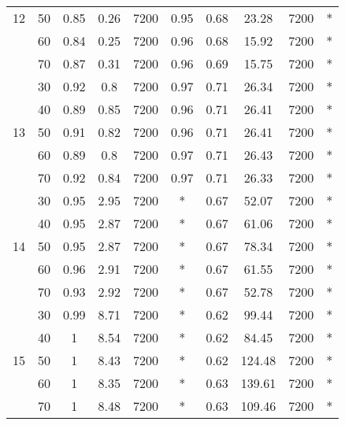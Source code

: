 \documentclass{itor}
\theoremstyle{definition}
\theoremstyle{remark}
\begin{document}
\begin{table}[htbp]
\begin{tabular}{|c|c|cccc|cccc|}
    12    & 50    & 0.85  & 0.26  & 7200  & 0.95  & 0.68  & 23.28 & 7200  & * \\
          & 60    & 0.84  & 0.25  & 7200  & 0.96  & 0.68  & 15.92 & 7200  & * \\
          & 70    & 0.87  & 0.31  & 7200  & 0.96  & 0.69  & 15.75 & 7200  & * \\
    \midrule
          & 30    & 0.92  & 0.8   & 7200  & 0.97  & 0.71  & 26.34 & 7200  & * \\
          & 40    & 0.89  & 0.85  & 7200  & 0.96  & 0.71  & 26.41 & 7200  & * \\
    13    & 50    & 0.91  & 0.82  & 7200  & 0.96  & 0.71  & 26.41 & 7200  & * \\
          & 60    & 0.89  & 0.8   & 7200  & 0.97  & 0.71  & 26.43 & 7200  & * \\
          & 70    & 0.92  & 0.84  & 7200  & 0.97  & 0.71  & 26.33 & 7200  & * \\
    \midrule
          & 30    & 0.95  & 2.95  & 7200  & *     & 0.67  & 52.07 & 7200  & * \\
          & 40    & 0.95  & 2.87  & 7200  & *     & 0.67  & 61.06 & 7200  & * \\
    14    & 50    & 0.95  & 2.87  & 7200  & *     & 0.67  & 78.34 & 7200  & * \\
          & 60    & 0.96  & 2.91  & 7200  & *     & 0.67  & 61.55 & 7200  & * \\
          & 70    & 0.93  & 2.92  & 7200  & *     & 0.67  & 52.78 & 7200  & * \\
    \midrule
          & 30    & 0.99  & 8.71  & 7200  & *     & 0.62  & 99.44 & 7200  & * \\
          & 40    & 1     & 8.54  & 7200  & *     & 0.62  & 84.45 & 7200  & * \\
    15    & 50    & 1     & 8.43  & 7200  & *     & 0.62  & 124.48 & 7200  & * \\
          & 60    & 1     & 8.35  & 7200  & *     & 0.63  & 139.61 & 7200  & * \\
          & 70    & 1     & 8.48  & 7200  & *     & 0.63  & 109.46 & 7200  & * \\
    \bottomrule
    \end{tabular}%
  \label{table:tab3}%
\end{table}%

\end{document}
